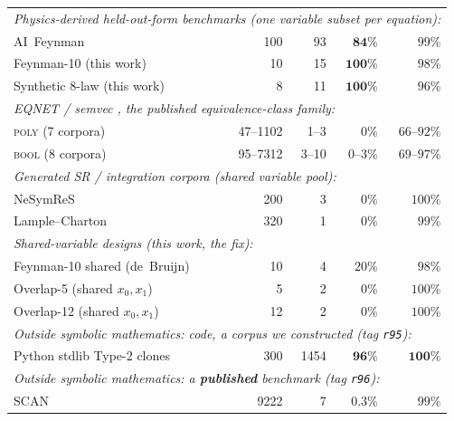 \begin{table}[t]
\begin{tabular}{l r r r r}
\midrule
\multicolumn{5}{l}{\emph{Physics-derived held-out-form benchmarks (one variable subset per equation):}} \\
AI~Feynman \citep{udrescu2020ai}      & 100 & 93 & $\mathbf{84\%}$  & $99\%$ \\
\quad Feynman-10 (this work)          & 10  & 15 & $\mathbf{100\%}$ & $98\%$ \\
\quad Synthetic 8-law (this work)     & 8   & 11 & $\mathbf{100\%}$ & $96\%$ \\
\midrule
\multicolumn{5}{l}{\emph{EQNET / semvec \citep{allamanis2017learning}, the published equivalence-class family:}} \\
\quad \textsc{poly} (7 corpora)       & 47--1102 & 1--3 & $0\%$   & $66$--$92\%$ \\
\quad \textsc{bool} (8 corpora)       & 95--7312 & 3--10 & $0$--$3\%$ & $69$--$97\%$ \\
\midrule
\multicolumn{5}{l}{\emph{Generated SR / integration corpora (shared variable pool):}} \\
NeSymReS \citep{biggio2021neural}     & 200 & 3  & $0\%$   & $100\%$ \\
Lample--Charton \citep{lample2019deep}& 320 & 1  & $0\%$   & $99\%$ \\
\midrule
\multicolumn{5}{l}{\emph{Shared-variable designs (this work, the fix):}} \\
Feynman-10 shared (de~Bruijn)         & 10  & 4  & $20\%$  & $98\%$ \\
Overlap-5 (shared $x_0,x_1$)          & 5   & 2  & $0\%$   & $100\%$ \\
Overlap-12 (shared $x_0,x_1$)         & 12  & 2  & $0\%$   & $100\%$ \\
\midrule
\multicolumn{5}{l}{\emph{Outside symbolic mathematics: code, a corpus we constructed (tag \texttt{r95}):}} \\
Python stdlib Type-2 clones           & 300 & 1454 & $\mathbf{96\%}$ & $\mathbf{100\%}$ \\
\midrule
\multicolumn{5}{l}{\emph{Outside symbolic mathematics: a \textbf{published} benchmark (tag \texttt{r96}):}} \\
SCAN \citep{lake2018generalization}   & 9222 & 7 & $0.3\%$ & $99\%$ \\
\bottomrule
\end{tabular}
\end{table}
